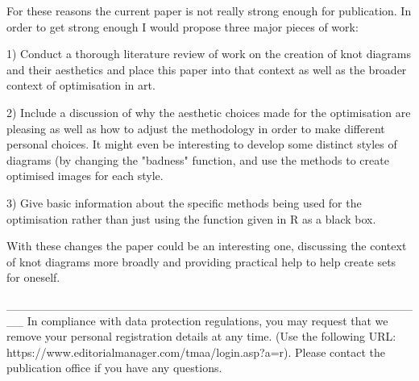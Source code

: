 For these reasons the current paper is not really strong enough for
publication. In order to get strong enough I would propose three major
pieces of work:

1) Conduct a thorough literature review of work on the creation of
knot diagrams and their aesthetics and place this paper into that
context as well as the broader context of optimisation in art.

2) Include a discussion of why the aesthetic choices made for the
optimisation are pleasing as well as how to adjust the methodology in
order to make different personal choices. It might even be interesting
to develop some distinct styles of diagrams (by changing the "badness"
function, and use the methods to create optimised images for each
style.

3) Give basic information about the specific methods being used for
the optimisation rather than just using the function given in R as a
black box.

With these changes the paper could be an interesting one, discussing
the context of knot diagrams more broadly and providing practical help
to help create sets for oneself.

__________________________________________________
In compliance with data protection regulations, you may request that we remove your personal registration details at any time.  (Use the following URL: https://www.editorialmanager.com/tmaa/login.asp?a=r). Please contact the publication office if you have any questions.

